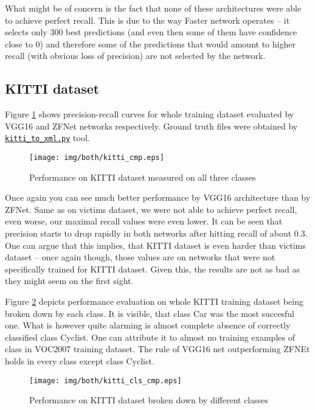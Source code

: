 What might be of concern is the fact that none of these architectures were able to achieve perfect recall. This is due to the way Faster \rcnn{} network operates -- it selects only 300 best predictions (and even then some of them have confidence close to 0) and therefore some of the predictions that would amount to higher recall (with obvious loss of precision) are not selected by the network.

\subsection{KITTI dataset}
Figure \ref{kittio} shows precision-recall curves for whole training dataset evaluated by VGG16 and ZFNet networks respectively. Ground truth files were obtained by \hyperref[ktx]{\texttt{kitti\_to\_xml.py}} tool.

\begin{figure}[!]
\texttt{[image: img/both/kitti\_cmp.eps]}
\caption{Performance on KITTI dataset measured on all three classes}
\label{kittio}
\end{figure}

Once again you can see much better performance by VGG16 architecture than by ZFNet. Same as on victims dataset, we were not able to achieve perfect recall, even worse, our maximal recall values were even lower. It can be seen that precision starts to drop rapidly in both networks after hitting recall of about 0.3. One can argue that this implies, that KITTI dataset is even harder than victims dataset -- once again though, those values are on networks that were not specifically trained for KITTI dataset. Given this, the results are not as bad as they might seem on the first sight.

Figure \ref{kittic} depicts performance evaluation on whole KITTI training dataset being broken down by each class. It is visible, that class Car was the most succesful one. What is however quite alarming is almost complete absence of correctly classified class Cyclist. One can attribute it to almost no training examples of class  in VOC2007 training dataset. The rule of VGG16 net outperforming ZFNEt holds in every class except class Cyclist.

\begin{figure}[!]
\texttt{[image: img/both/kitti\_cls\_cmp.eps]}
\caption{Performance on KITTI dataset broken down by different classes}
\label{kittic}
\end{figure}

